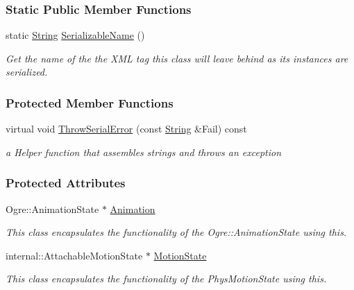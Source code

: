 \subsubsection*{Static Public Member Functions}
\begin{DoxyCompactItemize}
\item 
static \hyperlink{namespaceMezzanine_acf9fcc130e6ebf08e3d8491aebcf1c86}{String} \hyperlink{classMezzanine_1_1ActorBase_af6f41bdc0932b99f82f317d27d8dc906}{SerializableName} ()
\begin{DoxyCompactList}\small\item\em Get the name of the the XML tag this class will leave behind as its instances are serialized. \item\end{DoxyCompactList}\end{DoxyCompactItemize}
\subsubsection*{Protected Member Functions}
\begin{DoxyCompactItemize}
\item 
virtual void \hyperlink{classMezzanine_1_1ActorBase_a24d196b9fc55048fb183a7920b5bbd3e}{ThrowSerialError} (const \hyperlink{namespaceMezzanine_acf9fcc130e6ebf08e3d8491aebcf1c86}{String} \&Fail) const 
\begin{DoxyCompactList}\small\item\em a Helper function that assembles strings and throws an exception \item\end{DoxyCompactList}\end{DoxyCompactItemize}
\subsubsection*{Protected Attributes}
\begin{DoxyCompactItemize}
\item 
\hypertarget{classMezzanine_1_1ActorBase_ae71259b98aed5a9c269e0758344d36a7}{
Ogre::AnimationState $\ast$ \hyperlink{classMezzanine_1_1ActorBase_ae71259b98aed5a9c269e0758344d36a7}{Animation}}
\label{classMezzanine_1_1ActorBase_ae71259b98aed5a9c269e0758344d36a7}

\begin{DoxyCompactList}\small\item\em This class encapsulates the functionality of the Ogre::AnimationState using this. \item\end{DoxyCompactList}\item 
\hypertarget{classMezzanine_1_1ActorBase_a5c3fc257ac5167d9bffd5ffd94f2647c}{
internal::AttachableMotionState $\ast$ \hyperlink{classMezzanine_1_1ActorBase_a5c3fc257ac5167d9bffd5ffd94f2647c}{MotionState}}
\label{classMezzanine_1_1ActorBase_a5c3fc257ac5167d9bffd5ffd94f2647c}

\begin{DoxyCompactList}\small\item\em This class encapsulates the functionality of the PhysMotionState using this. \item\end{DoxyCompactList}\end{DoxyCompactItemize}
